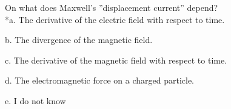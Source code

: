 
On what does Maxwell's ''displacement current'' depend? \\

*a. The derivative of the electric field with respect to time.

b. The divergence of the magnetic field.

c. The derivative of the magnetic field with respect to time.

d. The electromagnetic force on a charged particle.

e. I do not know \\
